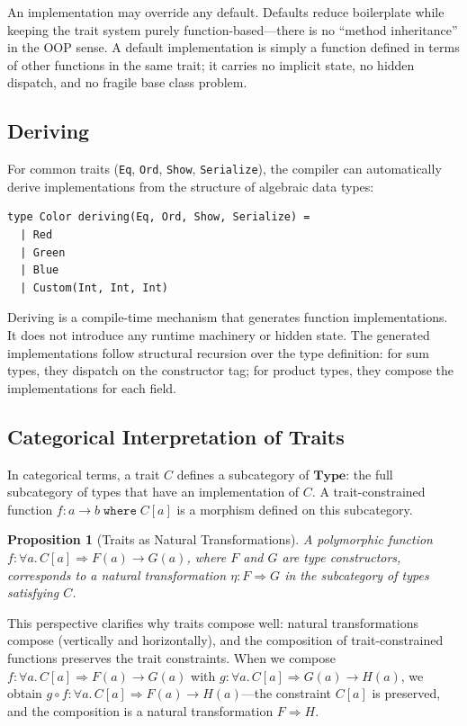 \documentclass[11pt,a4paper]{article}
\newtheorem{proposition}[theorem]{Proposition}
\newcommand{\cat}[1]{\mathbf{#1}}
\newcommand{\Type}{\cat{Type}}
\begin{document}
An implementation may override any default. Defaults reduce boilerplate while keeping the trait system purely function-based---there is no ``method inheritance'' in the OOP sense. A default implementation is simply a function defined in terms of other functions in the same trait; it carries no implicit state, no hidden dispatch, and no fragile base class problem.

\subsection{Deriving}

For common traits (\texttt{Eq}, \texttt{Ord}, \texttt{Show}, \texttt{Serialize}), the compiler can automatically derive implementations from the structure of algebraic data types:

\begin{lstlisting}
type Color deriving(Eq, Ord, Show, Serialize) =
  | Red
  | Green
  | Blue
  | Custom(Int, Int, Int)
\end{lstlisting}

Deriving is a compile-time mechanism that generates function implementations. It does not introduce any runtime machinery or hidden state. The generated implementations follow structural recursion over the type definition: for sum types, they dispatch on the constructor tag; for product types, they compose the implementations for each field.

\subsection{Categorical Interpretation of Traits}

In categorical terms, a trait $C$ defines a subcategory of $\Type$: the full subcategory of types that have an implementation of $C$. A trait-constrained function $f : a \to b \;\texttt{where}\; C[a]$ is a morphism defined on this subcategory.

\begin{proposition}[Traits as Natural Transformations]
A polymorphic function $f : \forall a.\, C[a] \Rightarrow F(a) \to G(a)$, where $F$ and $G$ are type constructors, corresponds to a natural transformation $\eta : F \Rightarrow G$ in the subcategory of types satisfying $C$.
\end{proposition}

This perspective clarifies why traits compose well: natural transformations compose (vertically and horizontally), and the composition of trait-constrained functions preserves the trait constraints. When we compose $f : \forall a.\, C[a] \Rightarrow F(a) \to G(a)$ with $g : \forall a.\, C[a] \Rightarrow G(a) \to H(a)$, we obtain $g \circ f : \forall a.\, C[a] \Rightarrow F(a) \to H(a)$---the constraint $C[a]$ is preserved, and the composition is a natural transformation $F \Rightarrow H$.
\end{document}
